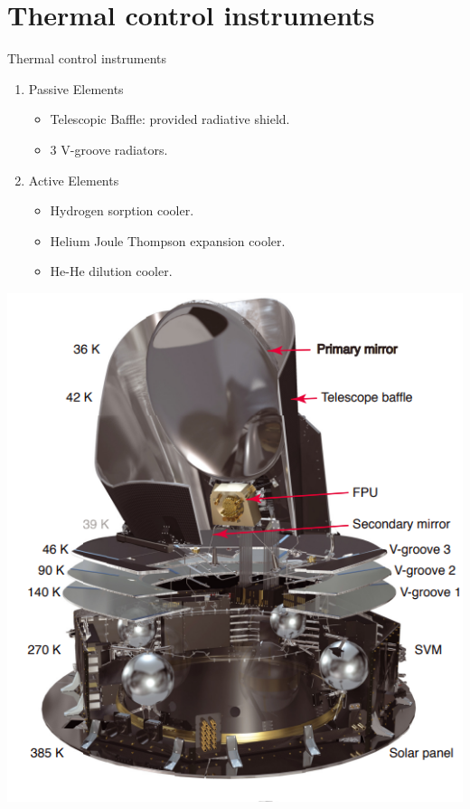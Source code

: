 \section{Thermal control instruments}
\begin{frame}{Thermal control instruments}

    
    \begin{minipage}{0.5\textwidth}

   \begin{enumerate}
       \item Passive Elements
         \begin{itemize}
         \item Telescopic Baffle: provided radiative shield.
         \item 3 V-groove radiators.
         \end{itemize}
         \item Active Elements
         \begin{itemize}
         \item Hydrogen sorption cooler.
         \item Helium Joule Thompson expansion cooler.
         \item He-He dilution cooler.

         \end{itemize}
    \end{enumerate}
    \end{minipage}
    \begin{minipage}{0.45\textwidth}
    \includegraphics[width=0.9\linewidth]{Figures/cut_T_view.png} 
    \end{minipage}
\end{frame}

